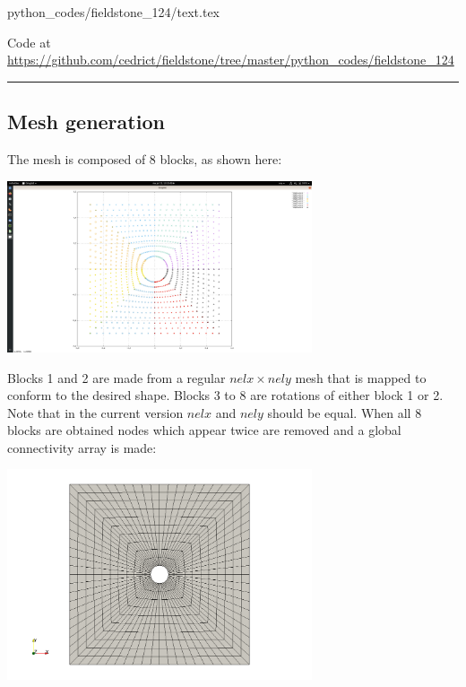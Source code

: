 \begin{flushright} {\tiny {\color{gray} python\_codes/fieldstone\_124/text.tex}} \end{flushright}



\begin{center}

Code at \url{https://github.com/cedrict/fieldstone/tree/master/python_codes/fieldstone_124}
\end{center}

\par\noindent\rule{\textwidth}{0.4pt}





\subsection*{Mesh generation}

The mesh is composed of 8 blocks, as shown here:

\begin{center}
\includegraphics[width=9cm]{python_codes/fieldstone_124/results/mesh1}
\end{center}

Blocks 1 and 2 are made from a regular $nelx\times nely$ mesh that is 
mapped to conform to the desired shape. Blocks 3 to 8 are rotations 
of either block 1 or 2. Note that in the current version $nelx$ and
$nely$ should be equal.
When all 8 blocks are obtained nodes which appear twice are removed
and a global connectivity array is made: 

\begin{center}
\includegraphics[width=9cm]{python_codes/fieldstone_124/results/mesh2}
\end{center}


